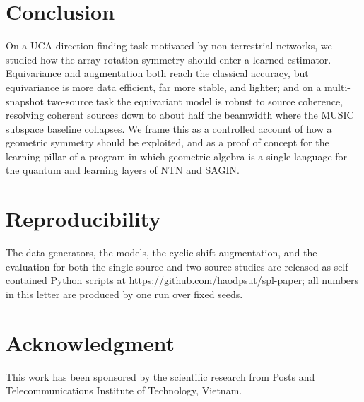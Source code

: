 \documentclass[conference]{IEEEtran}
\begin{document}
\section{Conclusion}
On a UCA direction-finding task motivated by non-terrestrial networks, we studied
how the array-rotation symmetry should enter a learned estimator. Equivariance and
augmentation both reach the classical accuracy, but equivariance is more data
efficient, far more stable, and lighter; and on a multi-snapshot two-source task the
equivariant model is robust to source coherence, resolving coherent sources down to
about half the beamwidth where the MUSIC subspace baseline collapses. We frame this as a controlled account of how a geometric
symmetry should be exploited, and as a proof of concept for the learning pillar of a
program in which geometric algebra is a single language for the quantum and learning
layers of NTN and SAGIN.

\section*{Reproducibility}
The data generators, the models, the cyclic-shift augmentation, and the evaluation
for both the single-source and two-source studies are released as self-contained
Python scripts at \url{https://github.com/haodpsut/spl-paper}; all numbers in this
letter are produced by one run over fixed seeds.

\section*{Acknowledgment}
This work has been sponsored by the scientific research from Posts and
Telecommunications Institute of Technology, Vietnam.
\end{document}
